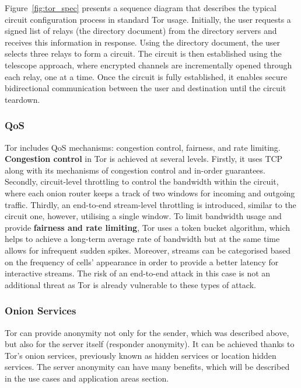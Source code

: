 Figure~\ref{fig:tor_spec} presents a sequence diagram that describes the typical circuit configuration process in standard Tor usage. Initially, the user requests a signed list of relays (the directory document) from the directory servers and receives this information in response. Using the directory document, the user selects three relays to form a circuit. The circuit is then established using the telescope approach, where encrypted channels are incrementally opened through each relay, one at a time. Once the circuit is fully established, it enables secure bidirectional communication between the user and destination until the circuit teardown.

\subsubsection{QoS}
Tor includes QoS mechanisms: congestion control, fairness, and rate limiting. \textbf{Congestion control} in Tor is achieved at several levels. Firstly, it uses TCP along with its mechanisms of congestion control and in-order guarantees. Secondly, circuit-level throttling to control the bandwidth within the circuit, where each onion router keeps a track of two windows for incoming and outgoing traffic. Thirdly, an end-to-end stream-level throttling is introduced, similar to the circuit one, however, utilising a single window. To limit bandwidth usage and provide \textbf{fairness and rate limiting}, Tor uses a token bucket algorithm, which helps to achieve a long-term average rate of bandwidth but at the same time allows for infrequent sudden spikes. Moreover, streams can be categorised based on the frequency of cells' appearance in order to provide a better latency for interactive streams. The risk of an end-to-end attack in this case is not an additional threat as Tor is already vulnerable to these types of attack.

\subsubsection{Onion Services}
Tor can provide anonymity not only for the sender, which was described above, but also for the server itself (responder anonymity). It can be achieved thanks to Tor’s onion services, previously known as hidden services or location hidden services. The server anonymity can have many benefits, which will be described in the use cases and application areas section.

